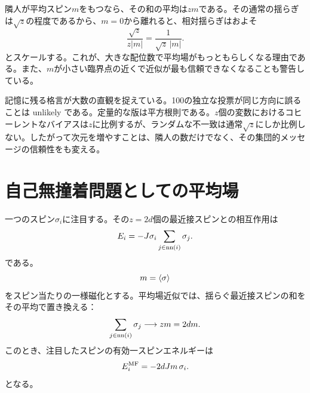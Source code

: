 隣人が平均スピン\(m\)をもつなら、その和の平均は\(zm\)である。その通常の揺らぎは\(\sqrt{z}\)の程度であるから、\(m=0\)から離れると、相対揺らぎはおよそ
\begin{equation}
\frac{\sqrt{z}}{z|m|}
=\frac{1}{\sqrt{z}\,|m|}.
\end{equation}
とスケールする。これが、大きな配位数で平均場がもっともらしくなる理由である。また、\(m\)が小さい臨界点の近くで近似が最も信頼できなくなることも警告している。

記憶に残る格言が大数の直観を捉えている。100の独立な投票が同じ方向に誤ることは unlikely である。定量的な版は平方根則である。\(z\)個の変数におけるコヒーレントなバイアスは\(z\)に比例するが、ランダムな不一致は通常\(\sqrt{z}\)にしか比例しない。したがって次元を増やすことは、隣人の数だけでなく、その集団的メッセージの信頼性をも変える。

\begin{classroomqa}
\end{classroomqa}

\section{自己無撞着問題としての平均場}

一つのスピン\(\sigma_i\)に注目する。その\(z=2d\)個の最近接スピンとの相互作用は
\begin{equation}
E_i=-J\sigma_i\sum_{j\in{\rm nn}(i)}\sigma_j.
\label{eq:local-energy}
\end{equation}
である。
\begin{equation}
m=\left\langle\sigma\right\rangle
\end{equation}
をスピン当たりの一様磁化とする。平均場近似では、揺らぐ最近接スピンの和をその平均で置き換える：
\begin{equation}
\sum_{j\in{\rm nn}(i)}\sigma_j
\longrightarrow zm=2dm.
\end{equation}
このとき、注目したスピンの有効一スピンエネルギーは
\begin{equation}
E_i^{\rm MF}=-2dJm\,\sigma_i.
\label{eq:mean-field-energy}
\end{equation}
となる。

